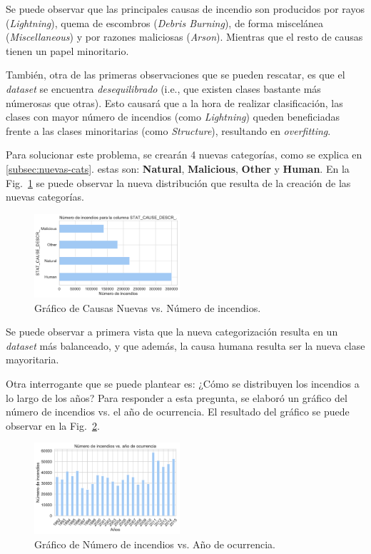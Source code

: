 Se puede observar que las principales causas de incendio son producidos por rayos (\textit{Lightning}), quema de escombros (\textit{Debris Burning}), de forma miscelánea (\textit{Miscellaneous}) y por razones maliciosas (\textit{Arson}). Mientras que el resto de causas tienen un papel minoritario. 

También, otra de las primeras observaciones que se pueden rescatar, es que el \textit{dataset} se encuentra \textit{desequilibrado} (i.e., que existen clases bastante más númerosas que otras). Esto causará que a la hora de realizar clasificación, las clases con mayor número de incendios (como \textit{Lightning}) queden beneficiadas frente a las clases minoritarias (como \textit{Structure}), resultando en \textit{overfitting}.

Para solucionar este problema, se crearán 4 nuevas categorías, como se explica en \ref{subsec:nuevas-cats}. estas son: \textbf{Natural}, \textbf{Malicious}, \textbf{Other} y \textbf{Human}. En la Fig.~\ref{fig:SCDN} se puede observar la nueva distribución que resulta de la creación de las nuevas categorías.
\begin{figure}
    \centering
    \includegraphics[width=0.48\textwidth]{imagenes/barh_STAT_CAUSE_DESCR_.pdf}
    \caption{Gráfico de Causas Nuevas vs. Número de incendios.}
    \label{fig:SCDN}
\end{figure}

Se puede observar a primera vista que la nueva categorización resulta en un \textit{dataset} más balanceado, y que además, la causa humana resulta ser la nueva clase mayoritaria.

Otra interrogante que se puede plantear es: ¿Cómo se distribuyen los incendios a lo largo de los años? Para responder a esta pregunta, se elaboró un gráfico del número de incendios vs. el año de ocurrencia. El resultado del gráfico se puede observar en la Fig.~\ref{fig:Year-Ocurr}.
\begin{figure}
    \centering
    \includegraphics[width=0.48\textwidth]{imagenes/YEAR_OCURRENCIA.pdf}
    \caption{Gráfico de Número de incendios vs. Año de ocurrencia.}
    \label{fig:Year-Ocurr}
\end{figure}

